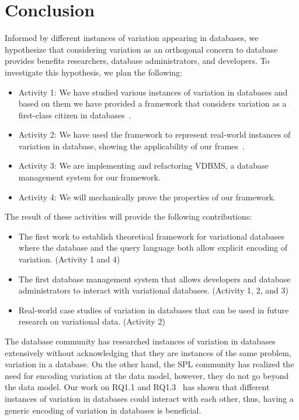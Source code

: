 \section{Conclusion}
\label{sec:con}

Informed by different instances of variation appearing in databases, we hypothesize that considering 
variation as an orthogonal concern to database provides benefits researchers, database administrators, and developers.
To investigate this hypothesis, we plan the following:

\begin{itemize}
\item Activity 1: We have studied various instances of variation in databases and based on them
we have provided a framework that considers variation as a first-class citizen in databases~\cite{ATW17dbpl,ATW18poly}.
\item Activity 2: We have used the framework to represent real-world instances of variation in database,
showing the applicability of our frames~\cite{ALW21vamos}.
\item Activity 3: We are implementing and refactoring VDBMS, a database management system for our
framework.
\item Activity 4: We will mechanically prove the properties of our framework.
\end{itemize}

\noindent
The result of these activities will provide the following contributions:

\begin{itemize}
\item The first work to establish theoretical framework for variational databases where the database and the query language both 
allow explicit encoding of variation. (Activity 1 and 4)
\item The first database management system that allows developers and database administrators to interact with variational databases. (Activity 1, 2, and 3)
\item Real-world case studies of variation in databases that can be used in future research on variational data. (Activity 2)
\end{itemize}

The database community has researched instances of variation in databases extensively without 
acknowledging that they are instances of the same problem, variation in a database. On the other
hand, the SPL community has realized the need for encoding variation at the data model, however,
they do not go beyond the data model. Our work on RQ1.1 and RQ1.3~\cite{ALW21vamos} has
shown that different instances of variation in databases could interact with each other, thus, 
having a generic encoding of variation in databases is beneficial. 